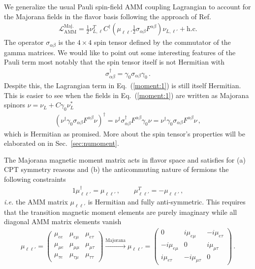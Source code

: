 \documentclass[addchapnum]{ws-rv961x669} %
\newcommand{\req}[1]{Eq.~(\ref{#1})}
\newcommand{\rsec}[1]{Sec.~{\ref{#1}}}
\begin{document}
We generalize the usual Pauli spin-field AMM coupling Lagrangian to account for the Majorana fields in the flavor basis following the approach of Ref.~\citeauthor{giunti2007fundamentals}
\begin{align}
	\label{moment:1}
    \mathcal{L}_{\mathrm{AMM}}^\mathrm{Maj.}=\frac{1}{2}\nu_{L,\ell}^{T}C^{\dag}\left(\mu_{\ell\ell'}\frac{1}{2}\sigma_{\alpha\beta}F^{\alpha\beta}\right)\nu_{L,\ell'}+\mathrm{h.c.}
\end{align}
The operator $\sigma_{\alpha\beta}$ is the $4\times 4$ spin tensor defined by the commutator of the gamma matrices. We would like to point out some interesting features of the Pauli term most notably that the spin tensor itself is not Hermitian with
\begin{align}
    \label{notherm:1}
    \sigma_{\alpha\beta}^{\dag} = \gamma_{0}\sigma_{\alpha\beta}\gamma_{0}\,.
\end{align}
Despite this, the Lagrangian term in \req{moment:1} is still itself Hermitian. This is easier to see when the fields in \req{moment:1} are written as Majorana spinors $\nu=\nu_{L}+C\gamma_{0}\nu_{L}^{*}$
\begin{align}
    \left(\nu^{\dag}\gamma_{0}\sigma_{\alpha\beta}F^{\alpha\beta}\nu\right)^{\dag} = \nu^{\dag}\sigma_{\alpha\beta}^{\dag}F^{\alpha\beta}\gamma_{0}\nu = \nu^{\dag}\gamma_{0}\sigma_{\alpha\beta}F^{\alpha\beta}\nu\,,
\end{align}
which is Hermitian as promised. More about the spin tensor's properties will be elaborated on in \rsec{sec:numoment}.

The Majorana magnetic moment matrix acts in flavor space and satisfies for (a) CPT symmetry reasons and (b) the anticommuting nature of fermions the following constraints~\cite{Giunti:2014ixa}
\begin{alignat}{1}
	\label{props:1}
    \mu_{\ell\ell'}^{\dag}=\mu_{\ell\ell'}\,,\qquad
    \mu_{\ell\ell'}^{T}=-\mu_{\ell\ell'}\,,
\end{alignat}
{\it i.e.\/} the AMM matrix $\mu_{\ell\ell'}$ is Hermitian and fully anti-symmetric. This requires that the transition magnetic moment elements are purely imaginary while all diagonal AMM matrix elements vanish
\begin{align}
    \label{mu:1}
    \mu_{\ell\ell'}=
	\begin{pmatrix}
		\mu_{ee} & \mu_{e\mu} & \mu_{e\tau} \\
		\mu_{\mu e} & \mu_{\mu\mu} & \mu_{\mu\tau} \\
		\mu_{\tau e} & \mu_{\tau\mu} & \mu_{\tau\tau}
	\end{pmatrix}\xrightarrow{\mathrm{Majorana}}
    \mu_{\ell\ell'}=
    \begin{pmatrix}
        0 & i\mu_{e\mu} & -i\mu_{e\tau} \\
		-i\mu_{e\mu} & 0 & i\mu_{\mu\tau} \\
		i\mu_{e\tau} & -i\mu_{\mu\tau} & 0
    \end{pmatrix}\,.
\end{align}
\end{document}
